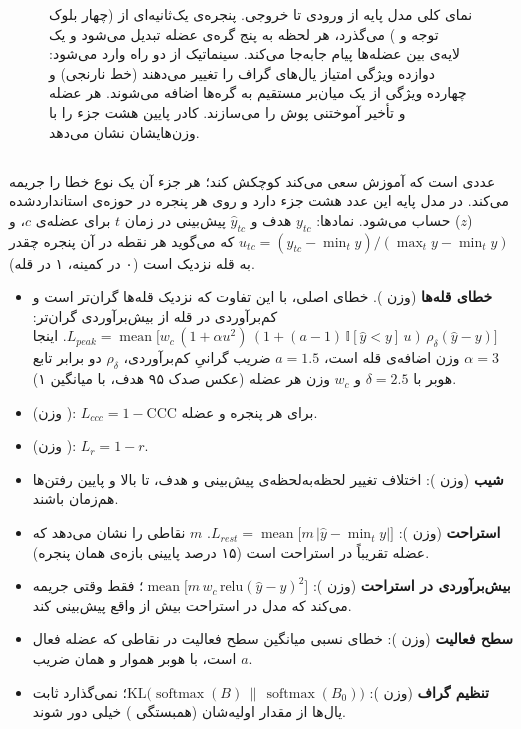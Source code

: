 \begin{figure}[p]
\centering

\caption{نمای کلی مدل پایه  از ورودی تا خروجی. پنجره‌ی یک‌ثانیه‌ای  از   (چهار بلوک توجه و ) می‌گذرد، هر لحظه به پنج گره‌ی عضله تبدیل می‌شود و یک لایه‌ی  بین عضله‌ها پیام جابه‌جا می‌کند. سینماتیک از دو راه وارد می‌شود: دوازده ویژگی امتیاز یال‌های گراف را تغییر می‌دهند (خط نارنجی) و چهارده ویژگی از یک میان‌بر مستقیم به گره‌ها اضافه می‌شوند.  هر عضله و تأخیر آموختنی پوش  را می‌سازند. کادر پایین هشت جزء  را با وزن‌هایشان نشان می‌دهد.}
\label{fig:base-arch}
\end{figure}

\subsection{}

 عددی است که آموزش سعی می‌کند کوچکش کند؛ هر جزء آن یک نوع خطا را جریمه می‌کند. در مدل پایه این عدد هشت جزء دارد و روی هر پنجره در حوزه‌ی استانداردشده ($z$) حساب می‌شود. نمادها: $y_{tc}$ هدف و $\hat y_{tc}$ پیش‌بینی در زمان $t$ برای عضله‌ی $c$، و $u_{tc}=(y_{tc}-\min_t y)/(\max_t y-\min_t y)$ که می‌گوید هر نقطه در آن پنجره چقدر به قله نزدیک است (۰ در کمینه، ۱ در قله).

\begin{itemize}
\item \textbf{خطای قله‌ها} (وزن ). خطای اصلی، با این تفاوت که نزدیک قله‌ها گران‌تر است و کم‌برآوردی در قله از بیش‌برآوردی گران‌تر:
$L_{peak}=\operatorname{mean}\big[w_c\,(1+\alpha u^2)\,(1+(a-1)\,\mathbb{I}[\hat y<y]\,u)\,\rho_\delta(\hat y-y)\big]$.
اینجا $\alpha=3$ وزن اضافه‌ی قله است، $a=1.5$ ضریب گرانیِ کم‌برآوردی، $\rho_\delta$ دو برابر تابع هوبر با $\delta=2.5$ و $w_c$ وزن هر عضله (عکس صدک ۹۵ هدف، با میانگین ۱).
\item \textbf{} (وزن ): $L_{ccc}=1-\mathrm{CCC}$ برای هر پنجره و عضله.
\item \textbf{} (وزن ): $L_{r}=1-r$.
\item \textbf{شیب} (وزن ): اختلاف تغییر لحظه‌به‌لحظه‌ی پیش‌بینی و هدف، تا بالا و پایین رفتن‌ها هم‌زمان باشند.
\item \textbf{استراحت} (وزن ): $L_{rest}=\operatorname{mean}\big[m\,|\hat y-\min_t y|\big]$. $m$ نقاطی را نشان می‌دهد که عضله تقریباً در استراحت است (۱۵ درصد پایینی بازه‌ی همان پنجره).
\item \textbf{بیش‌برآوردی در استراحت} (وزن ): $\operatorname{mean}\big[m\,w_c\,\mathrm{relu}(\hat y-y)^2\big]$؛ فقط وقتی جریمه می‌کند که مدل در استراحت بیش از واقع پیش‌بینی کند.
\item \textbf{سطح فعالیت} (وزن ): خطای نسبی میانگین سطح فعالیت در نقاطی که عضله فعال است، با هوبر هموار و همان ضریب $a$.
\item \textbf{تنظیم گراف} (وزن ): $\mathrm{KL}\big(\operatorname{softmax}(B)\,\|\,\operatorname{softmax}(B_0)\big)$؛ نمی‌گذارد  ثابت یال‌ها از مقدار اولیه‌شان (همبستگی ) خیلی دور شوند.
\end{itemize}

